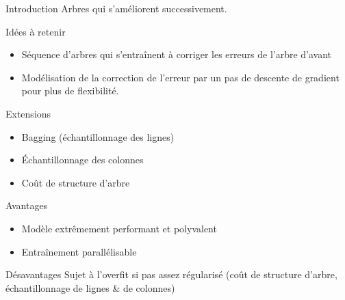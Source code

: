 \begin{frame}{Introduction}
  Arbres qui s'améliorent successivement.
\end{frame}

\begin{frame}{Idées à retenir}
  \begin{itemize}
    \item Séquence d'arbres qui s'entraînent à corriger les erreurs de l'arbre d'avant
    \item Modélisation de la correction de l'erreur par un pas de descente de gradient pour plus de flexibilité.
  \end{itemize}
\end{frame}

\begin{frame}{Extensions}
  \begin{itemize}
    \item Bagging (échantillonnage des lignes)
    \item Échantillonnage des colonnes
    \item Coût de structure d'arbre
  \end{itemize}
\end{frame}

\begin{frame}{Avantages}
  \begin{itemize}
    \item Modèle extrêmement performant et polyvalent
    \item Entraînement parallélisable
  \end{itemize}
\end{frame}

\begin{frame}{Désavantages}
  Sujet à l'overfit si pas assez régularisé (coût de structure d'arbre, échantillonnage de lignes \& de colonnes)
\end{frame}
